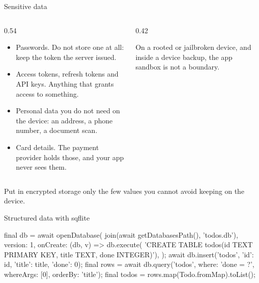 \documentclass[10pt,aspectratio=169,t]{beamer}
\begin{document}
\begin{frame}[eyebrow=Storage]{Sensitive data}
  \begin{columns}[T]
    \begin{column}{0.54\textwidth}
      \vskip 1mm
      \begin{itemize}
        \item Passwords. Do not store one at all: keep the token the server issued.
        \item Access tokens, refresh tokens and API keys. Anything that grants access to something.
        \item Personal data you do not need on the device: an address, a phone number, a document scan.
        \item Card details. The payment provider holds those, and your app never sees them.
      \end{itemize}
    \end{column}
    \begin{column}{0.42\textwidth}
      \vskip 1mm
      \begin{warning}
        On a rooted or jailbroken device, and inside a device backup, the app sandbox is not a boundary.
      \end{warning}
      \vskip 2mm
    \end{column}
  \end{columns}
  \begin{takeaway}{Put in encrypted storage only the few values you cannot avoid keeping on the device.}\end{takeaway}
\end{frame}

\begin{frame}[fragile,eyebrow=Storage]{Structured data with sqflite}
\begin{dart}
final db = await openDatabase(
  join(await getDatabasesPath(), 'todos.db'),
  version: 1,
  onCreate: (db, v) => db.execute(
    'CREATE TABLE todos(id TEXT PRIMARY KEY, title TEXT, done INTEGER)'),
);
await db.insert('todos', {'id': id, 'title': title, 'done': 0});
final rows = await db.query('todos',
    where: 'done = ?', whereArgs: [0], orderBy: 'title');
final todos = rows.map(Todo.fromMap).toList();
\end{dart}
  \vskip 2mm
\end{frame}
\end{document}

